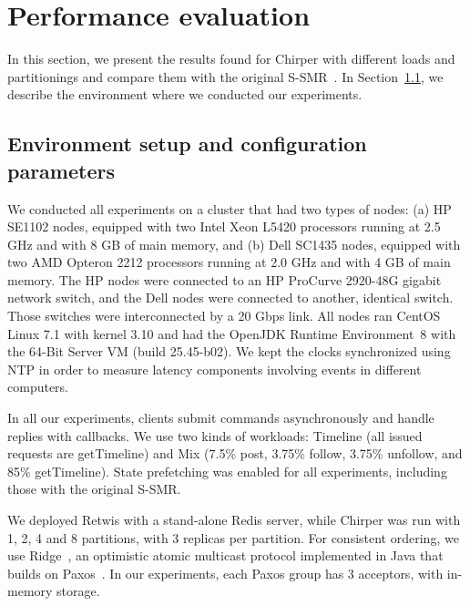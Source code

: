 \section{Performance evaluation}
\label{sec:experiments}


In this section, we present the results found for Chirper with different loads and partitionings and compare them with the original S-SMR~\cite{bezerra2014ssmr}.
In Section~\ref{sec:evaluation:setup}, we describe the environment where we conducted our experiments.

\subsection{Environment setup and configuration parameters}
\label{sec:evaluation:setup}

We conducted all experiments on a cluster that had two types of nodes: (a) HP SE1102 nodes, equipped with two Intel Xeon L5420 processors running at 2.5 GHz and with 8 GB of main memory, and (b) Dell SC1435 nodes, equipped with two AMD Opteron 2212 processors running at 2.0 GHz and with 4 GB of main memory. The HP nodes were connected to an HP ProCurve 2920-48G gigabit network switch, and the Dell nodes were connected to another, identical switch. Those switches were interconnected by a 20 Gbps link.
All nodes ran CentOS Linux 7.1 with kernel 3.10 and had the OpenJDK Runtime Environment~8 with the \mbox{64-Bit} Server VM (build 25.45-b02).
We kept the clocks synchronized using NTP in order to measure latency components involving events in different computers.

In all our experiments, clients submit commands asynchronously and handle replies with callbacks.
We use two kinds of workloads: Timeline (all issued requests are getTimeline) and Mix (7.5\% post, 3.75\% follow, 3.75\% unfollow, and 85\% getTimeline).
State prefetching was enabled for all experiments, including those with the original S-SMR.

We deployed Retwis with a stand-alone Redis server, while Chirper was run with 1, 2, 4 and 8 partitions, with 3 replicas per partition. For consistent ordering, we use Ridge~\cite{bezerra2015ridgetr}, an optimistic atomic multicast protocol implemented in Java that builds on Paxos~\cite{Lam98}.
In our experiments, each Paxos group has 3 acceptors, with in-memory storage.